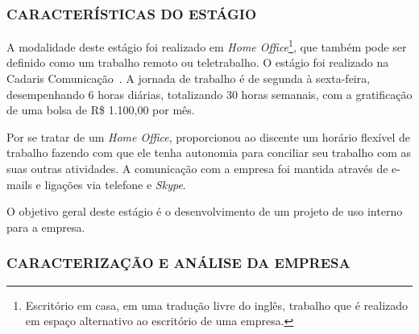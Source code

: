 \documentclass[
  12pt,				%
  openany,
  oneside,
  a4paper,			%
  english,			%
  brazil
]{article}
\numberwithin{figure}{section}
\numberwithin{table}{section}
\begin{document}
\subsubsection{CARACTERÍSTICAS DO ESTÁGIO}

A modalidade deste estágio foi realizado em \textit{Home Office}\footnote{Escritório em casa, em uma tradução livre do inglês, trabalho que é realizado em espaço alternativo ao escritório de uma empresa.}, que também pode ser definido como um trabalho remoto ou teletrabalho. O estágio foi realizado na Cadaris Comunicação~\cite{cadaris}. A jornada de trabalho é de segunda à sexta-feira, desempenhando 6 horas diárias, totalizando 30 horas semanais, com a gratificação de uma bolsa de R\$ 1.100,00 por mês.

Por se tratar de um \textit{Home Office}, proporcionou ao discente um horário flexível de trabalho fazendo com que ele tenha autonomia para conciliar seu trabalho com as suas outras atividades. A comunicação com a empresa foi mantida através de e-mails e ligações via telefone e \textit{Skype}.

O objetivo geral deste estágio é o desenvolvimento de um projeto de uso interno para a empresa.


\subsubsection{CARACTERIZAÇÃO E ANÁLISE DA EMPRESA}


\end{document}
